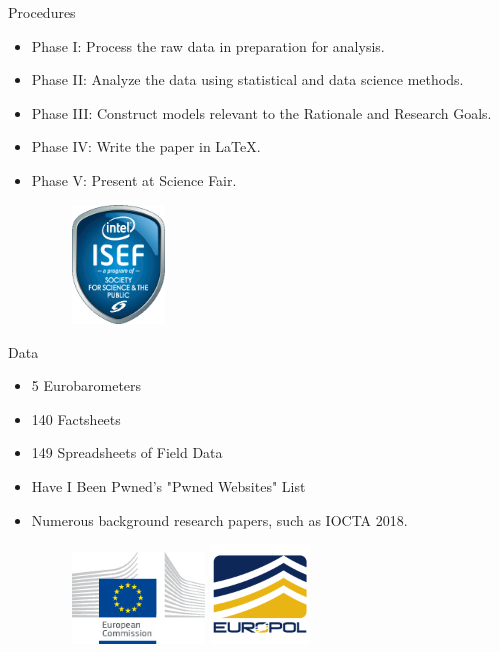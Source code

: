 \documentclass[aspectratio=32]{beamer}
\begin{document}
\begin{frame}{Procedures}

\begin{itemize}
    \item Phase I: Process the raw data in preparation for analysis.
    \item Phase II: Analyze the data using statistical and data science methods.
    \item Phase III: Construct models relevant to the Rationale and Research Goals.
    \item Phase IV: Write the paper in LaTeX. 
    \item Phase V: Present at Science Fair. 
    \begin{figure}
        \includegraphics[width=70pt]{isef.png}
    \end{figure}
\end{itemize}

\end{frame}

\begin{frame}{Data}

\begin{itemize}
    \item 5 Eurobarometers
    \item 140 Factsheets
    \item 149 Spreadsheets of Field Data
    \item Have I Been Pwned's "Pwned Websites" List
    \item Numerous background research papers, such as IOCTA 2018.
    \begin{figure}
        \includegraphics[width=100pt]{eu-commission.png}
        \includegraphics[width=75pt]{europol.png}
    \end{figure}
\end{itemize}

\end{frame}
\end{document}
